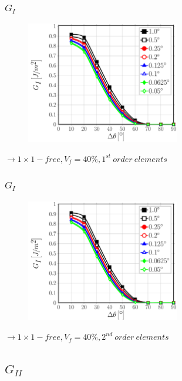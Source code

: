 \documentclass[first,firstsupp,lastsupp,last,hyperref,table]{ETHclass}
\begin{document}
\begin{frame}
\frametitle{\vspace{0.25cm}\small $G_{I}$}
\vspace{-.75cm}
\centering
\begin{figure}
\centering
\includegraphics[width=0.6\textwidth]{Vf40-free-1st-GI.pdf}
\end{figure}
$\rightarrow 1\times1-free, V_{f}=40\%, 1^{st}\ order\ elements$ 
\end{frame}

\addtocounter{framenumber}{-1}

\begin{frame}
\frametitle{\vspace{0.25cm}\small $G_{I}$}
\vspace{-.75cm}
\centering
\begin{figure}
\centering
\includegraphics[width=0.6\textwidth]{Vf40-free-2nd-GI.pdf}
\end{figure}
$\rightarrow 1\times1-free, V_{f}=40\%, 2^{nd}\ order\ elements$ 
\end{frame}

\subsection{$G_{II}$}
\end{document}
